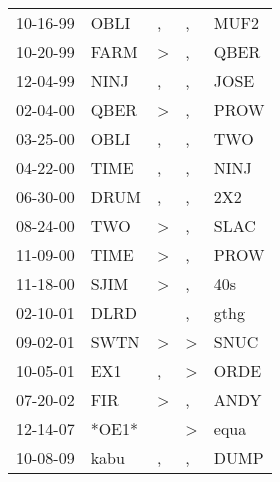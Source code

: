 \begin{supertabular}{p{0.07\textwidth}p{0.06\textwidth}p{0.02\textwidth}p{0.02\textwidth}p{0.06\textwidth}}
 10-16-99\textsuperscript{} &  OBLI\textsuperscript{} &             , &             , &  MUF2\textsuperscript{} \\
 10-20-99\textsuperscript{} &  FARM\textsuperscript{} &  \textgreater &             , &  QBER\textsuperscript{} \\
 12-04-99\textsuperscript{} &  NINJ\textsuperscript{} &             , &             , &  JOSE\textsuperscript{} \\
 02-04-00\textsuperscript{} &  QBER\textsuperscript{} &  \textgreater &             , &  PROW\textsuperscript{} \\
 03-25-00\textsuperscript{} &  OBLI\textsuperscript{} &             , &             , &   TWO\textsuperscript{} \\
 04-22-00\textsuperscript{} &  TIME\textsuperscript{} &             , &             , &  NINJ\textsuperscript{} \\
 06-30-00\textsuperscript{} &  DRUM\textsuperscript{} &             , &             , &   2X2\textsuperscript{} \\
 08-24-00\textsuperscript{} &   TWO\textsuperscript{} &  \textgreater &             , &  SLAC\textsuperscript{} \\
 11-09-00\textsuperscript{} &  TIME\textsuperscript{} &  \textgreater &             , &  PROW\textsuperscript{} \\
 11-18-00\textsuperscript{} &  SJIM\textsuperscript{} &  \textgreater &             , &   40s\textsuperscript{} \\
 02-10-01\textsuperscript{} &  DLRD\textsuperscript{} &               &             , &  gthg\textsuperscript{} \\
 09-02-01\textsuperscript{} &  SWTN\textsuperscript{} &  \textgreater &  \textgreater &  SNUC\textsuperscript{} \\
 10-05-01\textsuperscript{} &   EX1\textsuperscript{} &             , &  \textgreater &  ORDE\textsuperscript{} \\
 07-20-02\textsuperscript{} &   FIR\textsuperscript{} &  \textgreater &             , &  ANDY\textsuperscript{} \\
 12-14-07\textsuperscript{} &                   *OE1* &               &  \textgreater &  equa\textsuperscript{} \\
 10-08-09\textsuperscript{} &  kabu\textsuperscript{} &             , &             , &  DUMP\textsuperscript{} \\
\end{supertabular}
